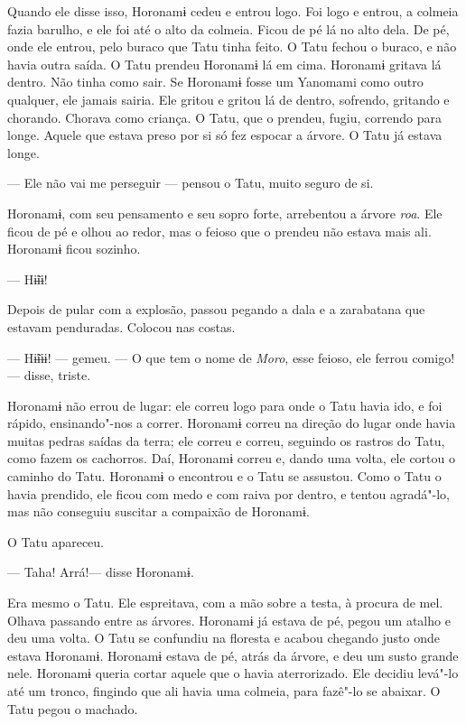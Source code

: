 Quando ele disse isso, Horonamɨ cedeu e entrou logo. Foi logo e entrou,
a colmeia fazia barulho, e ele foi até o alto da colmeia. Ficou de pé lá
no alto dela. De pé, onde ele entrou, pelo buraco que Tatu tinha feito.
O Tatu fechou o buraco, e não havia outra saída. O Tatu prendeu Horonamɨ
lá em cima. Horonamɨ gritava lá dentro. Não tinha como sair. Se Horonamɨ
fosse um Yanomami como outro qualquer, ele jamais sairia. Ele gritou e
gritou lá de dentro, sofrendo, gritando e chorando. Chorava como
criança. O Tatu, que o prendeu, fugiu, correndo para longe. Aquele que
estava preso por si só fez espocar a árvore. O Tatu já estava longe. 

--- Ele não vai me perseguir --- pensou o Tatu, muito seguro de si. 

Horonamɨ, com seu pensamento e seu sopro forte, arrebentou a
árvore \emph{roa}. Ele ficou de pé e olhou ao redor, mas o feioso que o
prendeu não estava mais ali. Horonamɨ ficou sozinho. 

--- Hɨ̃ɨɨ! 

Depois de pular com a explosão, passou pegando a dala e a zarabatana que
estavam penduradas. Colocou nas costas. 

--- Hɨ̃ɨɨɨ! --- gemeu. --- O que tem o nome de \emph{Moro}, esse feioso,
ele ferrou comigo! --- disse, triste.

Horonamɨ não errou de lugar: ele correu logo para onde o Tatu havia ido,
e foi rápido, ensinando"-nos a correr. Horonamɨ correu na direção do
lugar onde havia muitas pedras saídas da terra; ele correu e correu,
seguindo os rastros do Tatu, como fazem os cachorros. Daí, Horonamɨ
correu e, dando uma volta, ele cortou o caminho do Tatu. Horonamɨ o
encontrou e o Tatu se assustou. Como o Tatu o havia prendido, ele ficou
com medo e com raiva por dentro, e tentou agradá"-lo, mas não conseguiu
suscitar a compaixão de Horonamɨ. 

O Tatu apareceu.

--- Taha! Arrá!--- disse Horonamɨ. 

Era mesmo o Tatu. Ele espreitava, com a mão sobre a testa, à procura de
mel. Olhava passando entre as árvores. Horonamɨ já estava de pé, pegou
um atalho e deu uma volta. O Tatu se confundiu na floresta e acabou
chegando justo onde estava Horonamɨ. Horonamɨ estava de pé, atrás da
árvore, e deu um susto grande nele. Horonamɨ queria cortar aquele que o
havia aterrorizado. Ele decidiu levá"-lo até um tronco, fingindo que ali
havia uma colmeia, para fazê"-lo se abaixar. O Tatu pegou o machado. 

